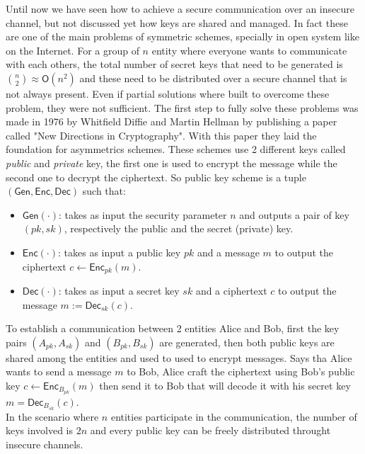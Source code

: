 Until now we have seen how to achieve a secure communication  over an insecure channel, but not discussed yet how keys are shared and managed. In fact these are one of the main problems of symmetric schemes, specially in open system like on the Internet. For a group of $n$ entity where everyone wants to communicate with each others, the total number of secret keys that need to be generated is $\binom{n}{2} \approx \mathsf{O}(n^2)$ and these need to be distributed over a secure channel that is not always present.
Even if partial solutions where built to overcome these problem, they were not sufficient.
The first step to fully solve these problems was made in 1976 by Whitfield Diffie and Martin Hellman by publishing a paper called "New Directions in Cryptography". With this paper they laid the foundation for asymmetrics schemes. These schemes use 2 different keys called \emph{public} and \emph{private} key, the first one is used to encrypt the message while the second one to decrypt the ciphertext.
So public key scheme is a tuple $(\mathsf{Gen}, \mathsf{Enc}, \mathsf{Dec})$ such that:
\begin{itemize}
    \item{$\mathsf{Gen}(\cdot)$: takes as input the security parameter $n$ and outputs a pair of key $(pk, sk)$, respectively the public and the secret (private) key.}
    \item{$\mathsf{Enc}(\cdot)$: takes as input a public key $pk$ and a message $m$ to output the ciphertext $c \leftarrow \mathsf{Enc}_{pk}(m)$.}
    \item{$\mathsf{Dec}(\cdot)$: takes as input a secret key $sk$ and a ciphertext $c$ to output the message $m := \mathsf{Dec}_{sk}(c)$.}
\end{itemize}
To establish a communication between 2 entities Alice and Bob, first the key pairs $(A_{pk}, A_{sk})$ and $(B_{pk}, B_{sk})$ are generated, then both public keys are shared among the entities and used to used to encrypt messages. Says tha Alice wants to send a message $m$ to Bob, Alice craft the ciphertext using Bob's public key $c \leftarrow  \mathsf{Enc}_{B_{pk}}(m)$ then send it to Bob that will decode it with his secret key $m = \mathsf{Dec}_{B_{sk}}(c)$.\\
In the scenario where $n$ entities participate in the communication, the number of keys involved is $2n$ and every public key can be freely distributed throught insecure channels.\\
